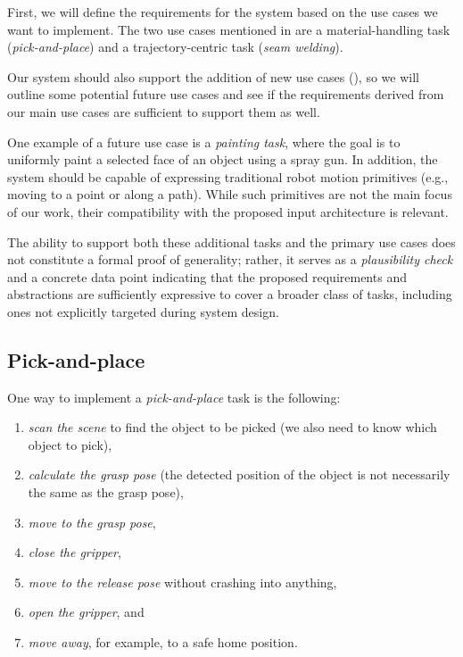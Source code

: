 First, we will define the requirements for the system based on the use cases we want to implement. The two use cases mentioned in  are a material-handling task (\emph{pick-and-place}) and a trajectory-centric task (\emph{seam welding}). 

Our system should also support the addition of new use cases (), so we will outline some potential future use cases and see if the requirements derived from our main use cases are sufficient to support them as well. 

One example of a future use case is a \emph{painting task}, where the goal is to uniformly paint a selected face of an object using a spray gun. In addition, the system should be capable of expressing traditional robot motion primitives (e.g., moving to a point or along a path). While such primitives are not the main focus of our work, their compatibility with the proposed input architecture is relevant.

The ability to support both these additional tasks and the primary use cases does not constitute a formal proof of generality; rather, it serves as a \emph{plausibility check} and a concrete data point indicating that the proposed requirements and abstractions are sufficiently expressive to cover a broader class of tasks, including ones not explicitly targeted during system design.

\subsection{Pick-and-place} \label{subsec:ch2_analysis_pick_and_place}

One way to implement a \emph{pick-and-place} task is the following:
\begin{enumerate}[label=(\arabic*), itemsep=0.2em]
    \item \emph{scan the scene} to find the object to be picked (we also need to know which object to pick),
    \item \emph{calculate the grasp pose} (the detected position of the object is not necessarily the same as the grasp pose),
    \item \emph{move to the grasp pose},
    \item \emph{close the gripper},
    \item \emph{move to the release pose} without crashing into anything,
    \item \emph{open the gripper}, and
    \item \emph{move away}, for example, to a safe home position.
\end{enumerate}

